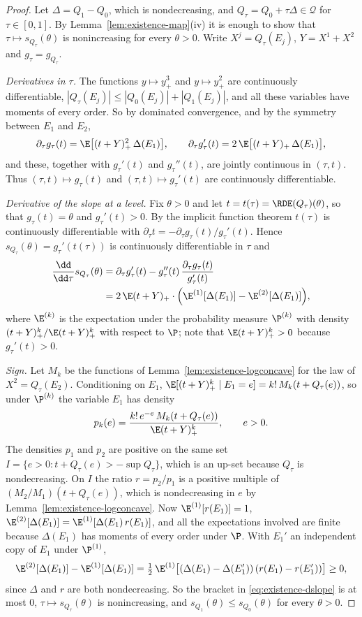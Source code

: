 \begin{proof}
Let $\Delta=Q_1-Q_0$, which is nondecreasing, and $Q_\tau=Q_0+\tau\Delta\in\mathcal{Q}$ for
$\tau\in[0,1]$. By Lemma~\ref{lem:existence-map}(iv) it is enough to show that
$\tau\mapsto s_{Q_\tau}(\theta)$ is nonincreasing for every $\theta>0$. Write
$X^j=Q_\tau(E_j)$, $Y=X^1+X^2$ and $g_\tau=g_{Q_\tau}$.

\emph{Derivatives in $\tau$.} The functions $y\mapsto y_+^3$ and $y\mapsto y_+^2$ are
continuously differentiable, $|Q_\tau(E_j)|\le|Q_0(E_j)|+|Q_1(E_j)|$, and all these variables
have moments of every order. So by dominated convergence, and by the symmetry between $E_1$
and $E_2$,
\[
  \partial_\tau g_\tau(t)=\E\bigl[(t+Y)_+^2\,\Delta(E_1)\bigr],\qquad
  \partial_\tau g_\tau'(t)=2\,\E\bigl[(t+Y)_+\,\Delta(E_1)\bigr],
\]
and these, together with $g_\tau'(t)$ and $g_\tau''(t)$, are jointly continuous in
$(\tau,t)$. Thus $(\tau,t)\mapsto g_\tau(t)$ and $(\tau,t)\mapsto g_\tau'(t)$ are continuously
differentiable.

\emph{Derivative of the slope at a level.} Fix $\theta>0$ and let $t=t(\tau)=\RDE(Q_\tau)(\theta)$,
so that $g_\tau(t)=\theta$ and $g_\tau'(t)>0$. By the implicit function theorem $t(\tau)$ is
continuously differentiable with $\partial_\tau t=-\partial_\tau g_\tau(t)/g_\tau'(t)$. Hence
$s_{Q_\tau}(\theta)=g_\tau'(t(\tau))$ is continuously differentiable in $\tau$ and
\begin{align}
  \frac{\dd}{\dd\tau}s_{Q_\tau}(\theta)
  &=\partial_\tau g_\tau'(t)-g_\tau''(t)\,\frac{\partial_\tau g_\tau(t)}{g_\tau'(t)}\notag\\
  &=2\,\E(t+Y)_+\cdot\Bigl(\E^{(1)}[\Delta(E_1)]-\E^{(2)}[\Delta(E_1)]\Bigr),\label{eq:existence-dslope}
\end{align}
where $\E^{(k)}$ is the expectation under the probability measure $\P^{(k)}$ with density
$(t+Y)_+^k/\E(t+Y)_+^k$ with respect to $\P$; note that $\E(t+Y)_+^k>0$ because
$g_\tau'(t)>0$.

\emph{Sign.} Let $M_k$ be the functions of Lemma~\ref{lem:existence-logconcave} for the law of
$X^2=Q_\tau(E_2)$. Conditioning on $E_1$, $\E[(t+Y)_+^k\mid E_1=e]=k!\,M_k(t+Q_\tau(e))$, so
under $\P^{(k)}$ the variable $E_1$ has density
\[
  p_k(e)=\frac{k!\,e^{-e}\,M_k(t+Q_\tau(e))}{\E(t+Y)_+^k},\qquad e>0 .
\]
The densities $p_1$ and $p_2$ are positive on the same set
$I=\{e>0:t+Q_\tau(e)>-\sup Q_\tau\}$, which is an up-set because $Q_\tau$ is nondecreasing. On
$I$ the ratio $r=p_2/p_1$ is a positive multiple of $(M_2/M_1)(t+Q_\tau(e))$, which is
nondecreasing in $e$ by Lemma~\ref{lem:existence-logconcave}. Now $\E^{(1)}[r(E_1)]=1$,
$\E^{(2)}[\Delta(E_1)]=\E^{(1)}[\Delta(E_1)\,r(E_1)]$, and all the expectations involved are
finite because $\Delta(E_1)$ has moments of every order under $\P$. With $E_1'$ an independent
copy of $E_1$ under $\P^{(1)}$,
\[
  \E^{(2)}[\Delta(E_1)]-\E^{(1)}[\Delta(E_1)]
  =\tfrac12\,\E^{(1)}\bigl[(\Delta(E_1)-\Delta(E_1'))\,(r(E_1)-r(E_1'))\bigr]\ge0 ,
\]
since $\Delta$ and $r$ are both nondecreasing. So the bracket in \eqref{eq:existence-dslope}
is at most $0$, $\tau\mapsto s_{Q_\tau}(\theta)$ is nonincreasing, and
$s_{Q_1}(\theta)\le s_{Q_0}(\theta)$ for every $\theta>0$.
\end{proof}

